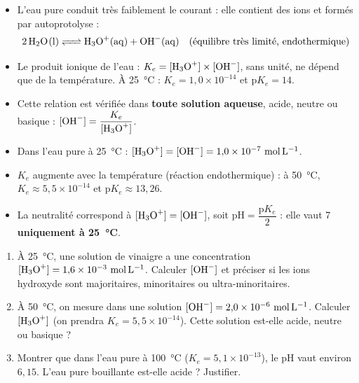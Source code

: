 \documentclass[11pt]{article}
\newcommand{\cle}[1]{{\popxbold\color{popdark}#1}}
\newcounter{popsec}
\newcounter{popsub}
\newcommand{\courssub}[1]{%
  \stepcounter{popsub}%
  \par\vspace{9pt}\noindent{\popxbold\fontsize{11.5}{13}\selectfont\color{popink}{\color{poporange}\thepopsec.\thepopsub}\hspace{6pt}#1}\par\nopagebreak\vspace{4pt}
}
\begin{document}
\courssub{Bilan de la section}

\begin{aretenir}
\begin{itemize}
\item L'eau pure conduit très faiblement le courant : elle contient des ions  et  formés par \cle{autoprotolyse} :
\[ \ce{2 H2O(l) <=> H3O+(aq) + OH-(aq)} \quad \text{(équilibre très limité, endothermique)} \]
\item Le \cle{produit ionique de l'eau} : $K_e = [\ce{H3O+}] \times [\ce{OH-}]$, sans unité, ne dépend que de la température. À \SI{25}{\celsius} : $K_e = 1{,}0 \times 10^{-14}$ et $\mathrm{p}K_e = 14$.
\item Cette relation est vérifiée dans \textbf{toute solution aqueuse}, acide, neutre ou basique : $[\ce{OH-}] = \dfrac{K_e}{[\ce{H3O+}]}$.
\item Dans l'eau pure à \SI{25}{\celsius} : $[\ce{H3O+}] = [\ce{OH-}] = 1{,}0 \times 10^{-7}~\si{mol.L^{-1}}$.
\item $K_e$ augmente avec la température (réaction endothermique) : à \SI{50}{\celsius}, $K_e \approx 5{,}5 \times 10^{-14}$ et $\mathrm{p}K_e \approx 13{,}26$.
\item La neutralité correspond à $[\ce{H3O+}] = [\ce{OH-}]$, soit $\mathrm{pH} = \dfrac{\mathrm{p}K_e}{2}$ : elle vaut 7 \textbf{uniquement à \SI{25}{\celsius}}.
\end{itemize}
\end{aretenir}

\begin{exercice}
\begin{enumerate}
\item À \SI{25}{\celsius}, une solution de vinaigre a une concentration $[\ce{H3O+}] = 1{,}6 \times 10^{-3}~\si{mol.L^{-1}}$. Calculer $[\ce{OH-}]$ et préciser si les ions hydroxyde sont majoritaires, minoritaires ou ultra-minoritaires.
\item À \SI{50}{\celsius}, on mesure dans une solution $[\ce{OH-}] = 2{,}0 \times 10^{-6}~\si{mol.L^{-1}}$. Calculer $[\ce{H3O+}]$ (on prendra $K_e = 5{,}5 \times 10^{-14}$). Cette solution est-elle acide, neutre ou basique ?
\item Montrer que dans l'eau pure à \SI{100}{\celsius} ($K_e = 5{,}1 \times 10^{-13}$), le pH vaut environ $6{,}15$. L'eau pure bouillante est-elle acide ? Justifier.
\end{enumerate}
\end{exercice}
\end{document}
